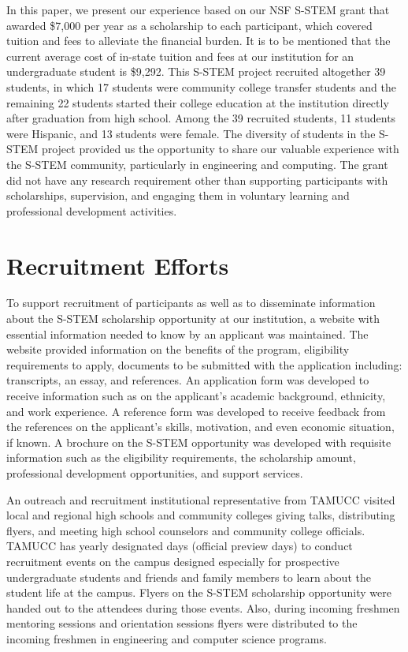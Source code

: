 \documentclass{article}
\begin{document}
In this paper, we present our experience based on our NSF S-STEM grant that awarded \$7,000 per year as a scholarship to each participant, which covered tuition and fees to alleviate the financial burden. It is to be mentioned that the current average cost of in-state tuition and fees at our institution for an undergraduate student is \$9,292.  This S-STEM project recruited altogether 39 students, in which 17 students were community college transfer students and the remaining 22 students started their college education at the institution directly after graduation from high school. Among the 39 recruited students, 11 students were Hispanic, and 13 students were female.   The diversity of students in the S-STEM project provided us the opportunity to share our valuable experience with the S-STEM community, particularly in engineering and computing. The grant did not have any research requirement other than supporting participants with scholarships, supervision, and engaging them in voluntary learning and professional development activities.


\section{Recruitment Efforts}

To support recruitment of participants as well as to disseminate information about the S-STEM scholarship opportunity at our institution, a website with essential information needed to know by an applicant was maintained. The website provided information on the benefits of the program, eligibility requirements to apply, documents to be submitted with the application including: transcripts, an essay, and references. An application form was developed to receive information such as on the applicant’s academic background, ethnicity, and work experience. A reference form was developed to receive feedback from the references on the applicant’s skills, motivation, and even economic situation, if known. A brochure on the S-STEM opportunity was developed with requisite information such as the eligibility requirements, the scholarship amount, professional development opportunities, and support services. 

An outreach and recruitment institutional representative from TAMUCC visited local and regional high schools and community colleges giving talks, distributing flyers, and meeting high school counselors and community college officials. TAMUCC has yearly designated days (official preview days) to conduct recruitment events on the campus designed especially for prospective undergraduate students and friends and family members to learn about the student life at the campus. Flyers on the S-STEM scholarship opportunity were handed out to the attendees during those events. Also, during incoming freshmen mentoring sessions and orientation sessions flyers were distributed to the incoming freshmen in engineering and computer science programs. 
\end{document}
